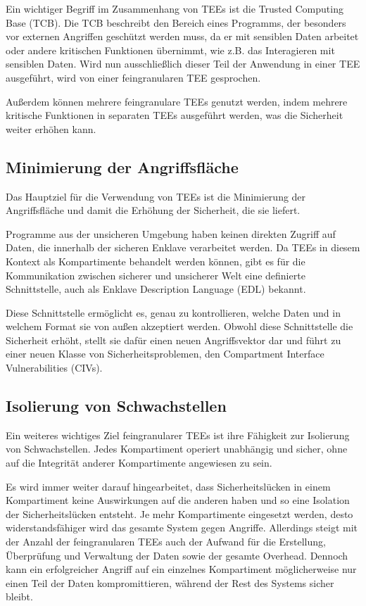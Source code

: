 Ein wichtiger Begriff im Zusammenhang von TEEs ist die Trusted Computing Base (TCB). Die TCB beschreibt den Bereich eines Programms, der besonders vor externen Angriffen geschützt werden muss, da er mit sensiblen Daten arbeitet oder andere kritischen Funktionen übernimmt, wie z.B. das Interagieren mit sensiblen Daten. Wird nun ausschließlich dieser Teil der Anwendung in einer TEE ausgeführt, wird von einer feingranularen TEE gesprochen.

Außerdem können mehrere feingranulare TEEs genutzt werden, indem mehrere kritische Funktionen in separaten TEEs ausgeführt werden, was die Sicherheit weiter erhöhen kann.

\subsection{Minimierung der Angriffsfläche}
Das Hauptziel für die Verwendung von TEEs ist die Minimierung der Angriffsfläche und damit die Erhöhung der Sicherheit, die sie liefert. 

Programme aus der unsicheren Umgebung haben keinen direkten Zugriff auf Daten, die innerhalb der sicheren Enklave verarbeitet werden. Da TEEs in diesem Kontext als Kompartimente behandelt werden können, gibt es für die Kommunikation zwischen sicherer und unsicherer Welt eine definierte Schnittstelle, auch als Enklave Description Language (EDL) bekannt. 

Diese Schnittstelle ermöglicht es, genau zu kontrollieren, welche Daten und in welchem Format sie von außen akzeptiert werden. Obwohl diese Schnittstelle die Sicherheit erhöht, stellt sie dafür einen neuen Angriffsvektor dar und führt zu einer neuen Klasse von Sicherheitsproblemen, den Compartment Interface Vulnerabilities (CIVs)\cite{CIVPaper}.

\subsection{Isolierung von Schwachstellen}
Ein weiteres wichtiges Ziel feingranularer TEEs ist ihre Fähigkeit zur Isolierung von Schwachstellen. Jedes Kompartiment operiert unabhängig und sicher, ohne auf die Integrität anderer Kompartimente angewiesen zu sein. 

Es wird immer weiter darauf hingearbeitet, dass Sicherheitslücken in einem Kompartiment keine Auswirkungen auf die anderen haben und so eine Isolation der Sicherheitslücken entsteht. Je mehr Kompartimente eingesetzt werden, desto widerstandsfähiger wird das gesamte System gegen Angriffe. Allerdings steigt mit der Anzahl der feingranularen TEEs auch der Aufwand für die Erstellung, Überprüfung und Verwaltung der Daten sowie der gesamte Overhead. Dennoch kann ein erfolgreicher Angriff auf ein einzelnes Kompartiment möglicherweise nur einen Teil der Daten kompromittieren, während der Rest des Systems sicher bleibt.

